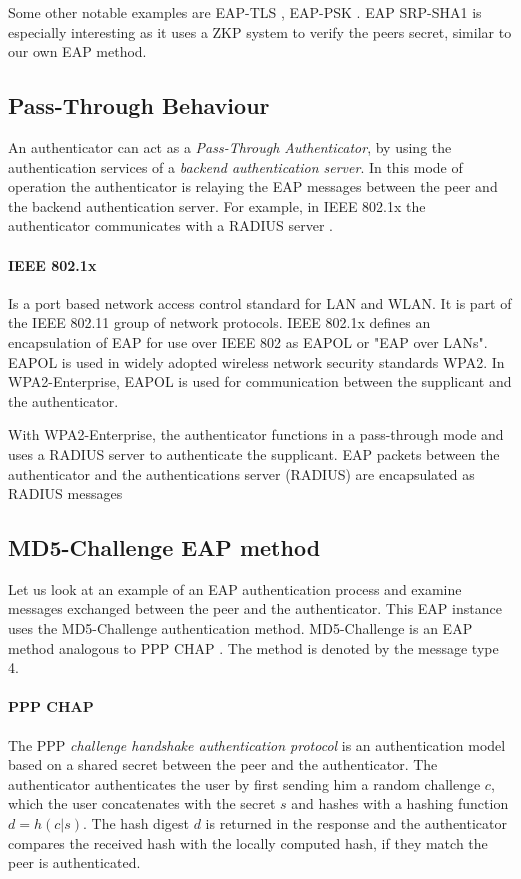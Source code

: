 Some other notable examples are EAP-TLS \cite{simon2008eap}, EAP-PSK \cite{bersani2007eap}.
EAP SRP-SHA1 \cite{ietf-pppext-eap-srp-03} is especially interesting as it uses a ZKP system to verify the peers secret, similar to our own EAP method.

\subsection{Pass-Through Behaviour}
An authenticator can act as a \textit{Pass-Through Authenticator}, by using the authentication services of a \textit{backend authentication server}.
In this mode of operation the authenticator is relaying the EAP messages between the peer and the backend authentication server.
For example, in IEEE 802.1x the authenticator communicates with a RADIUS server \cite{congdon2003ieee}.

\paragraph{IEEE 802.1x}

Is a port based network access control standard for LAN and WLAN.
It is part of the IEEE 802.11 group of network protocols.
IEEE 802.1x defines an encapsulation of EAP for use over IEEE 802 as EAPOL or "EAP over LANs".
EAPOL is used in widely adopted wireless network security standards WPA2. 
In WPA2-Enterprise, EAPOL is used for communication between the supplicant and the authenticator.

With WPA2-Enterprise, the authenticator functions in a pass-through mode and uses a RADIUS server to authenticate the supplicant.
EAP packets between the authenticator and the authentications server (RADIUS) are encapsulated as RADIUS messages \cite{aboba2003radius, chen2005extensible, congdon2003ieee}

\subsection{MD5-Challenge EAP method}
Let us look at an example of an EAP authentication process and examine messages exchanged between the peer and the authenticator. This EAP instance uses the MD5-Challenge authentication method.
MD5-Challenge is an EAP method analogous to PPP CHAP \cite{simpson1996ppp}. The method is denoted by the message type 4.

\paragraph{PPP CHAP}
The PPP \textit{challenge handshake authentication protocol} is an authentication model based on a shared secret between the peer and the authenticator.
The authenticator authenticates the user by first sending him a random challenge $c$, which the user concatenates with the secret $s$ and hashes with a hashing function $d = h(c | s)$.
The hash digest $d$ is returned in the response and the authenticator compares the received hash with the locally computed hash, if they match the peer is authenticated.

